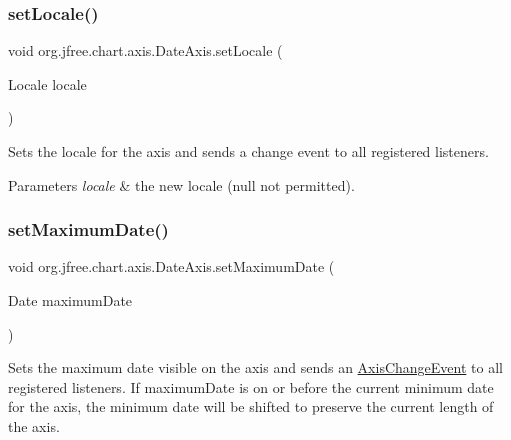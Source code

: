 \subsubsection{\texorpdfstring{set\+Locale()}{setLocale()}}
{\footnotesize\ttfamily void org.\+jfree.\+chart.\+axis.\+Date\+Axis.\+set\+Locale (\begin{DoxyParamCaption}\item[{Locale}]{locale }\end{DoxyParamCaption})}

Sets the locale for the axis and sends a change event to all registered listeners.


\begin{DoxyParams}{Parameters}
{\em locale} & the new locale ({\ttfamily null} not permitted). \\
\hline
\end{DoxyParams}
\mbox{\label{classorg_1_1jfree_1_1chart_1_1axis_1_1_date_axis_a39b7d4f271f0e436b2ddc59d942d493d}} 
\subsubsection{\texorpdfstring{set\+Maximum\+Date()}{setMaximumDate()}}
{\footnotesize\ttfamily void org.\+jfree.\+chart.\+axis.\+Date\+Axis.\+set\+Maximum\+Date (\begin{DoxyParamCaption}\item[{Date}]{maximum\+Date }\end{DoxyParamCaption})}

Sets the maximum date visible on the axis and sends an \mbox{\hyperlink{}{Axis\+Change\+Event}} to all registered listeners. If {\ttfamily maximum\+Date} is on or before the current minimum date for the axis, the minimum date will be shifted to preserve the current length of the axis.


